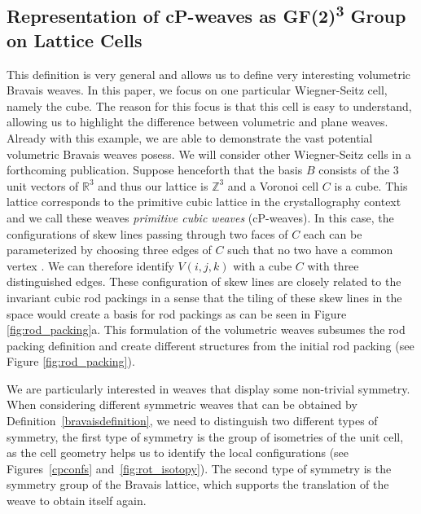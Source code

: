 \documentclass[unnumsec,webpdf,contemporary,large]{oup-authoring-template}%
\theoremstyle{thmstyleone}%
\theoremstyle{thmstyletwo}%
\theoremstyle{thmstylethree}%
\newcommand{\Z}{{\mathbb{Z}}}
\newcommand{\R}{{\mathbb{R}}}
\newcommand{\ACN}[1]{{\color{black} #1}}
\newcommand{\ergun}[1]{{\color{black} #1}}
\begin{document}
\subsection{Representation of cP-weaves as GF(2)\texorpdfstring{\textsuperscript{3}}{} Group on Lattice Cells}

\ACN{This definition is very general and allows us to define very interesting volumetric \ergun{Bravais} weaves. In this paper, we focus on one particular Wiegner-Seitz cell, namely the cube. The reason for this focus is that this cell is easy to understand, allowing us to highlight the difference between volumetric
and plane weaves. Already with this example, we are able to demonstrate the vast potential volumetric \ergun{Bravais} weaves posess. We will consider other Wiegner-Seitz cells in a forthcoming publication. }
%
Suppose henceforth that the basis $B$ consists of the 3 unit vectors of $\R^3$ and thus our lattice is $\Z^3$ and a Voronoi cell $C$ is a cube. This lattice corresponds to the primitive cubic lattice in the crystallography context and we call these weaves \emph{primitive cubic weaves} (cP-weaves). 
In this case, the configurations of skew lines passing through two faces of $C$ each can be parameterized by choosing three edges of $C$ such that no two have a common vertex \cite{viro2006configurations}. We can therefore identify  $V(i,j,k)$ with a cube $C$ with three distinguished edges. These configuration of skew lines are closely related to the invariant cubic rod packings \cite{okeeffe2001invariant_cubic_rod_packing} in a sense that the tiling of these skew lines in the space would create a basis for rod packings  as can be seen in Figure \ref{fig:rod_packing}a. This formulation of the volumetric weaves subsumes the rod packing definition and create different structures from the initial rod packing (see Figure \ref{fig:rod_packing}).

\ACN{We are particularly interested in weaves that display some non-trivial symmetry.}
When considering different \ACN{symmetric} weaves that can be obtained by Definition~\ref{bravaisdefinition}, we need to \ACN{distinguish}
two different types of symmetry, the first type of symmetry is the \ACN{group of isometries} of the unit cell, as 
the cell geometry helps us to identify the local configurations %
(see Figures~\ref{cpconfs} and~\ref{fig:rot_isotopy}). 
The second type of symmetry is the %
\ACN{symmetry group} of  the Bravais lattice,
 which supports the translation of the weave to obtain itself again.
\end{document}

